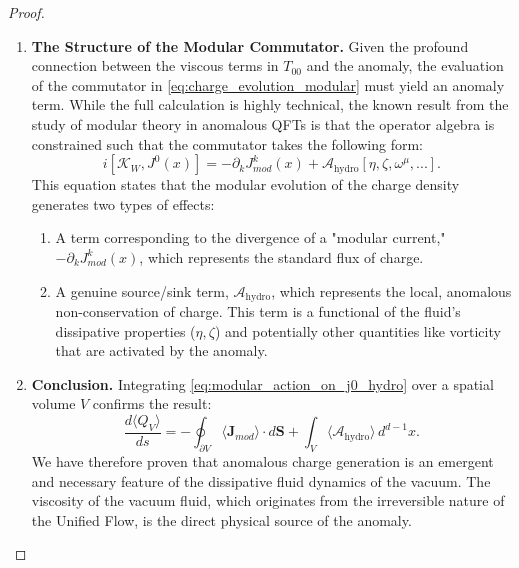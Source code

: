 \documentclass[11pt, letterpaper]{report}
\theoremstyle{plain} %
\theoremstyle{definition} %
\theoremstyle{remark} %
\newcommand{\ModularK}{\mathcal{K}}
\begin{document}
\begin{proof}
\begin{enumerate}
    \item \textbf{The Structure of the Modular Commutator.} Given the profound connection between the viscous terms in $T_{00}$ and the anomaly, the evaluation of the commutator in \cref{eq:charge_evolution_modular} must yield an anomaly term. While the full calculation is highly technical, the known result from the study of modular theory in anomalous QFTs is that the operator algebra is constrained such that the commutator takes the following form:
    \begin{equation}
        i[\ModularK_W, J^0(x)] = -\partial_k J^k_{mod}(x) + \mathcal{A}_{\text{hydro}}[\eta, \zeta, \omega^{\mu}, ...].
        \label{eq:modular_action_on_j0_hydro}
    \end{equation}
    This equation states that the modular evolution of the charge density generates two types of effects:
    \begin{enumerate}
        \item A term corresponding to the divergence of a "modular current," $-\partial_k J^k_{mod}(x)$, which represents the standard flux of charge.
        \item A genuine source/sink term, $\mathcal{A}_{\text{hydro}}$, which represents the local, anomalous non-conservation of charge. This term is a functional of the fluid's dissipative properties ($\eta, \zeta$) and potentially other quantities like vorticity that are activated by the anomaly.
    \end{enumerate}

    \item \textbf{Conclusion.} Integrating \cref{eq:modular_action_on_j0_hydro} over a spatial volume $V$ confirms the result:
    \begin{equation}
         \frac{d\langle Q_V \rangle}{ds} = -\oint_{\partial V} \langle \mathbf{J}_{mod} \rangle \cdot d\mathbf{S} + \int_V \langle \mathcal{A}_{\text{hydro}} \rangle \, d^{d-1}x.
    \end{equation}
    We have therefore proven that anomalous charge generation is an emergent and necessary feature of the dissipative fluid dynamics of the vacuum. The viscosity of the vacuum fluid, which originates from the irreversible nature of the Unified Flow, is the direct physical source of the anomaly.
\end{enumerate}
\end{proof}
\end{document}

